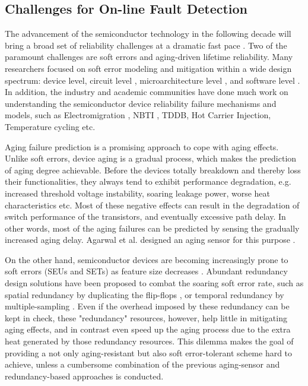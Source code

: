 \subsection{Challenges for On-line Fault Detection}
The advancement of the semiconductor technology in the following decade will bring a broad set of reliability challenges at a dramatic fast pace \cite{sematech03}. Two of the paramount challenges are soft errors and aging-driven lifetime reliability. Many researchers focused on soft error modeling and mitigation within a wide design spectrum: device level, circuit level \cite{Mitra_C05}\cite{Han_DT05}\cite{Zhang_TVLSI06}, microarchitecture level \cite{Vijaykumar_ISCA02}, and software level \cite{Oh_TR02}. In addition, the industry and academic communities have done much work on understanding the semiconductor device reliability failure mechanisms and models, such as Electromigration \cite{Electromigration_69}, NBTI \cite{NBTI_Impact05}\cite{Modeling-and-minimization_06}\cite{NBTItoComb_07}, TDDB, Hot Carrier Injection, Temperature cycling \cite{failure_models_00} etc.

Aging failure prediction \cite{failure_prediction_07} \cite{failure_prediction2_08} is a promising approach to cope with aging effects. Unlike soft errors, device aging is a gradual process, which makes the prediction of aging degree achievable. Before the devices totally breakdown and thereby loss their functionalities, they always tend to exhibit performance degradation, e.g. increased threshold voltage instability, soaring leakage power, worse heat characteristics etc. Most of these negative effects can result in the degradation of switch performance of the transistors\cite{degradation_05}, and eventually excessive path delay. In other words, most of the aging failures can be predicted by sensing the gradually increased aging delay. Agarwal et al. designed an aging sensor for this purpose \cite{failure_prediction_07}.

On the other hand, semiconductor devices are becoming increasingly prone to soft errors (SEUs and SETs) as feature size decreases \cite{Shivakumar_DSN02}. Abundant redundancy design solutions have been proposed to combat the soaring soft error rate, such as spatial redundancy by duplicating the flip-flops \cite{Mitra_C05} \cite{lowcost_date07}, or temporal redundancy by multiple-sampling \cite{Nicolaidis_VTS99}. Even if the overhead imposed by these redundancy can be kept in check, these "redundancy" resources, however, help little in mitigating aging effects, and in contrast even speed up the aging process due to the extra heat generated by those redundancy resources. This dilemma makes the goal of providing a not only aging-resistant but also soft error-tolerant scheme hard to achieve, unless a cumbersome combination of the previous aging-sensor and redundancy-based approaches is conducted.

